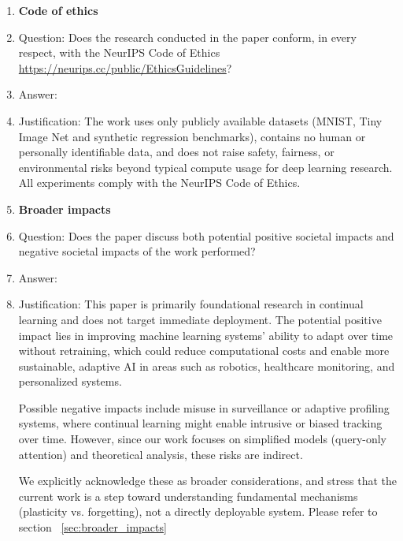 \begin{enumerate}
\item {\bf Code of ethics}
    \item[] Question: Does the research conducted in the paper conform, in every respect, with the NeurIPS Code of Ethics \url{https://neurips.cc/public/EthicsGuidelines}?
    \item[] Answer: \answerYes{} %
    \item[] Justification: The work uses only publicly available datasets (MNIST, Tiny Image Net and synthetic regression benchmarks), contains no human or personally identifiable data, and does not raise safety, fairness, or environmental risks beyond typical compute usage for deep learning research. All experiments comply with the NeurIPS Code of Ethics.


\item {\bf Broader impacts}
    \item[] Question: Does the paper discuss both potential positive societal impacts and negative societal impacts of the work performed?
    \item[] Answer: \answerYes{} %
    \item[] Justification: This paper is primarily foundational research in continual learning and does not target immediate deployment. The potential positive impact lies in improving machine learning systems’ ability to adapt over time without retraining, which could reduce computational costs and enable more sustainable, adaptive AI in areas such as robotics, healthcare monitoring, and personalized systems.

    Possible negative impacts include misuse in surveillance or adaptive profiling systems, where continual learning might enable intrusive or biased tracking over time. However, since our work focuses on simplified models (query-only attention) and theoretical analysis, these risks are indirect.

    We explicitly acknowledge these as broader considerations, and stress that the current work is a step toward understanding fundamental mechanisms (plasticity vs. forgetting), not a directly deployable system. Please refer to section ~\ref{sec:broader_impacts}
    

\end{enumerate}
